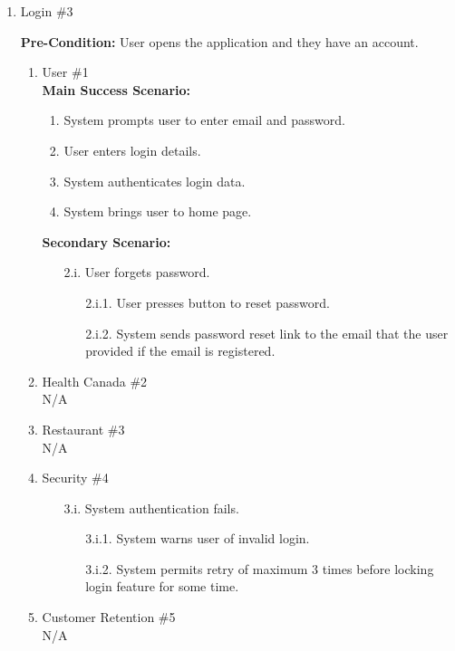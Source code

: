 \documentclass[]{article}
\begin{document}
\begin{enumerate}[{\bf BE1.}]
	\item Login \#3
	
	\textbf{Pre-Condition:} User opens the application and they have an account.
		\begin{enumerate}[{\bf VP1.}]
			\item User \#1 \\
				\textbf{Main Success Scenario:} 
				\begin{enumerate}[{1.}]
					\item System prompts user to enter email and password.
					\item User enters login details.
					\item System authenticates login data.
					\item System brings user to home page.
				\end{enumerate}
				\textbf{Secondary Scenario:}
				\begin{enumerate}
					\item[2.i.] User forgets password.
					\begin{enumerate}
						\item[2.i.1.] User presses button to reset password.
						\item[2.i.2.] System sends password reset link to the email that the user provided if the email is registered.
					\end{enumerate}
				\end{enumerate}
			\item Health Canada  \#2 \\
				N/A
			\item Restaurant \#3 \\
				N/A
			\item Security \#4 
			\begin{enumerate}
				\item[3.i.] System authentication fails.
				\begin{enumerate}
					\item[3.i.1.] System warns user of invalid login.
					\item[3.i.2.] System permits retry of maximum 3 times before locking login feature for some time.
				\end{enumerate}
			\end{enumerate}
			\item Customer Retention \#5 \\
				N/A
		\end{enumerate}


\end{enumerate}
\end{document}
